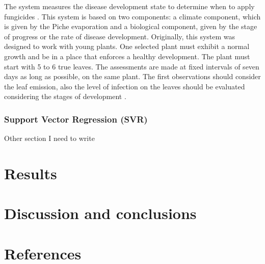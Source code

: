 \documentclass[review]{elsarticle}
\begin{document}
The system measures the disease development state to determine when to apply fungicides \citep{MarinVargas1995}. 
This system is based on two components: a climate component, which is given by the Piche evaporation and a biological component, given by the stage of progress or the rate of disease development. Originally, this system was designed to work with young plants. One selected plant must exhibit a normal growth and be in a place that enforces a healthy development. The plant must start with 5 to 6 true leaves. The assessments are made at fixed intervals of seven days as long as possible, on the same plant. The first observations should consider the leaf emission, also the level of infection on the leaves should be evaluated considering the stages of development \citep{MarinVargas1995}.

\subsubsection{Support Vector Regression (SVR)}

Other section
I need to write




\section{Results}

\section{Discussion and conclusions}

\section{References}
\end{document}
